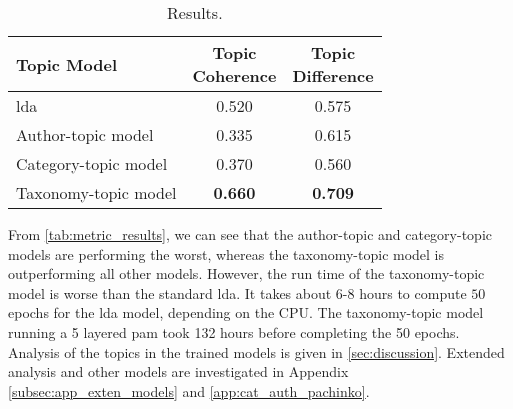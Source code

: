 \begin{table}[h]
	\centering
	\caption{Results.}
	\begin{tabular}{l|c|c}
		Topic Model & \makecell{Topic \\ Coherence} & \makecell{Topic \\ Difference} \\
		\midrule
		\Acrlong{lda} & 0.520 & 0.575 \\
		Author-topic model & 0.335 & 0.615 \\
		Category-topic model & 0.370 & 0.560 \\
		Taxonomy-topic model & \textbf{0.660} & \textbf{0.709} \\
	\end{tabular}
	\label{tab:metric_results}
\end{table}

From \autoref{tab:metric_results}, we can see that the author-topic and category-topic models are performing the worst, whereas the taxonomy-topic model is outperforming all other models.
However, the run time of the taxonomy-topic model is worse than the standard \gls{lda}.
It takes about $6$-$8$ hours to compute $50$ epochs for the \gls{lda} model, depending on the CPU. 
The taxonomy-topic model running a 5 layered \gls{pam} took 132 hours before completing the 50 epochs.
Analysis of the topics in the trained models is given in \autoref{sec:discussion}.
Extended analysis and other models are investigated in Appendix \autoref{subsec:app_exten_models} and \autoref{app:cat_auth_pachinko}.
